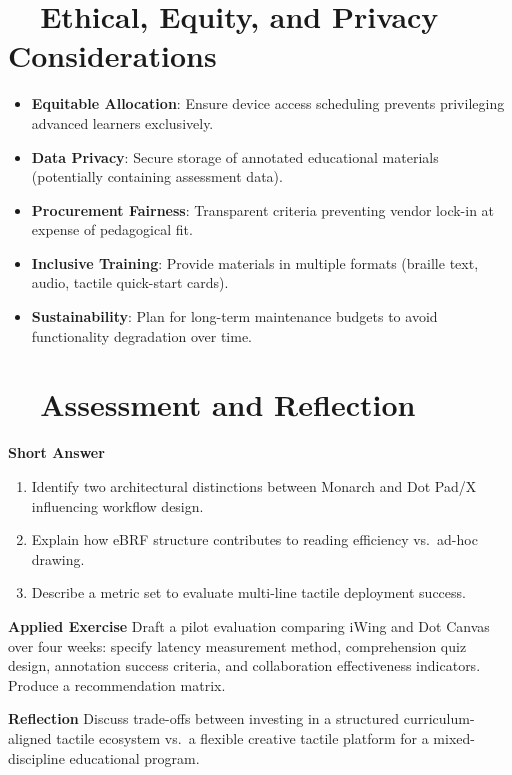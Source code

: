 \section{~~Ethical, Equity, and Privacy Considerations}
\label{sec:sr29-ethics}
\begin{itemize}
	\item \textbf{Equitable Allocation}: Ensure device access scheduling prevents privileging advanced learners exclusively.
	\item \textbf{Data Privacy}: Secure storage of annotated educational materials (potentially containing assessment data).
	\item \textbf{Procurement Fairness}: Transparent criteria preventing vendor lock-in at expense of pedagogical fit.
	\item \textbf{Inclusive Training}: Provide materials in multiple formats (braille text, audio, tactile quick-start cards).
	\item \textbf{Sustainability}: Plan for long-term maintenance budgets to avoid functionality degradation over time.
\end{itemize}

\section{~~Assessment and Reflection}
\label{sec:sr29-assessment}
\textbf{Short Answer}
\begin{enumerate}
	\item Identify two architectural distinctions between Monarch and Dot Pad/X influencing workflow design.
	\item Explain how eBRF structure contributes to reading efficiency vs.\ ad-hoc drawing.
	\item Describe a metric set to evaluate multi-line tactile deployment success.
\end{enumerate}

\textbf{Applied Exercise} Draft a pilot evaluation comparing iWing and Dot Canvas over four weeks: specify latency measurement method, comprehension quiz design, annotation success criteria, and collaboration effectiveness indicators. Produce a recommendation matrix.

\textbf{Reflection} Discuss trade-offs between investing in a structured curriculum-aligned tactile ecosystem vs.\ a flexible creative tactile platform for a mixed-discipline educational program.

